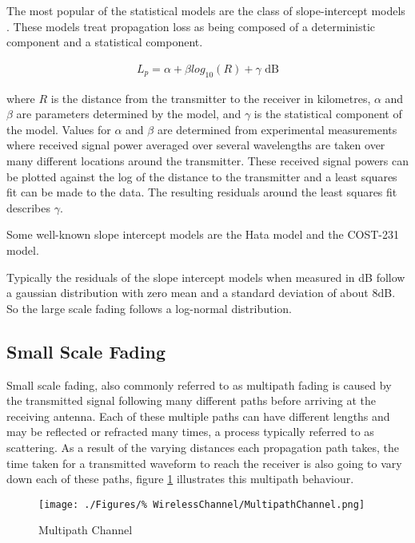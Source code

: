The most popular of the statistical models are the %
class of slope-intercept models \cite{Jer00}. These %
models treat propagation loss as being composed of %
a deterministic component and a statistical component.

\begin{align}
	L_{p} = \alpha + \beta log_{10}(R) + \gamma \text{ dB}
\end{align}

where $R$ is the distance from the transmitter to the %
receiver in kilometres, $\alpha$ and $\beta$ are parameters %
determined by the model, and $\gamma$ is the %
statistical component of the model. Values for $\alpha$ and %
$\beta$ are determined from experimental measurements %
where received signal power averaged over several %
wavelengths are taken over many different locations %
around the transmitter. These received signal %
powers can be plotted against the log of %
the distance to the transmitter and a least squares fit %
can be made to the data. The resulting residuals around %
the least squares fit describes $\gamma$.

Some well-known slope intercept models are the Hata%
\cite{Hata80} model and the COST-231 model\cite{COST231}.

Typically the residuals  of the slope intercept models %
when measured in dB follow a gaussian distribution with %
zero mean and a standard deviation of about 8dB\cite{Jer00}.
So the large scale fading follows a log-normal distribution.

\subsection{Small Scale Fading}

Small scale fading, also commonly referred to as multipath %
fading is caused by the transmitted signal following many %
different paths before arriving at the receiving antenna. %
Each of these multiple paths can have different lengths %
and may be reflected or refracted many times, a process %
typically referred to as scattering. As a result of the %
varying distances each propagation path takes, the time %
taken for a transmitted waveform to reach the receiver %
is also going to vary down each of these paths, figure %
\ref{fig:MultipathChannel} illustrates this multipath %
behaviour.

\begin{figure}[ht]
	\texttt{[image: ./Figures/\%
		WirelessChannel/MultipathChannel.png]}
	\caption{Multipath Channel \cite{Jer00}}
	\label{fig:MultipathChannel}
\end{figure} 

